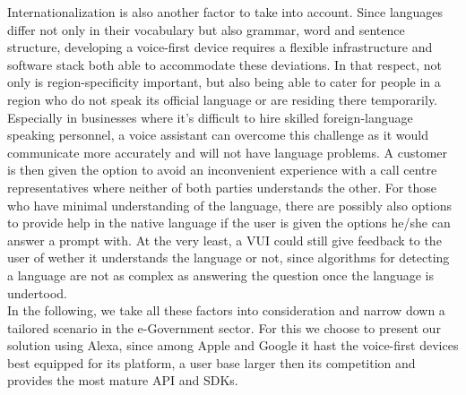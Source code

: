 Internationalization is also another factor to take into account. Since languages differ not only in their vocabulary but also grammar, word and sentence structure, developing a voice-first device requires a flexible infrastructure and software stack both able to accommodate these deviations.
In that respect, not only is region-specificity important, but also being able to cater for people in a region who do not speak its official language or are residing there temporarily.
Especially in businesses where it's difficult to hire skilled foreign-language speaking personnel, a voice assistant can overcome this challenge as it would communicate more accurately and will not have language problems.
A customer is then given the option to avoid an inconvenient experience with a call centre representatives where neither of both parties understands the other.
For those who have minimal understanding of the language, there are possibly also options to provide help in the native language if the user is given the options he/she can answer a prompt with. At the very least, a VUI could still give feedback to the user of wether it understands the language or not, since algorithms for detecting a language are not as complex as answering the question once the language is undertood.
\\



In the following, we take all these factors into consideration and narrow down a tailored scenario in the e-Government sector. For this we choose to present our solution using Alexa, since among Apple and Google it hast the voice-first devices best equipped for its platform, a user base larger then its competition and provides the most mature API and SDKs.\\


